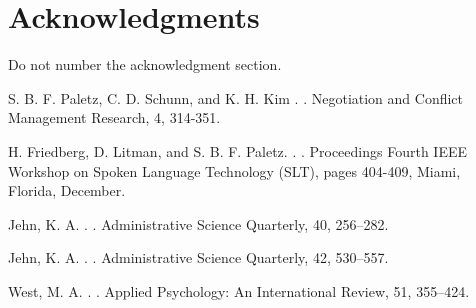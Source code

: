 \documentclass[11pt,letterpaper]{article}
\begin{document}
\section*{Acknowledgments}

Do not number the acknowledgment section.

\begin{thebibliography}{}

S. B. F. Paletz, C. D. Schunn, and K. H. Kim
. 
. 
\newblock Negotiation and Conflict Management Research, 4, 314-351.

H. Friedberg, D. Litman, and S. B. F. Paletz.
. 
. 
\newblock Proceedings Fourth IEEE Workshop on Spoken Language Technology (SLT), pages 404-409, Miami, Florida, December.

Jehn, K. A.
. 
. 
\newblock Administrative Science Quarterly, 40, 256–282.

Jehn, K. A.
. 
. 
\newblock Administrative Science Quarterly, 42, 530–557.

West, M. A.
. 
. 
\newblock Applied Psychology: An International Review, 51, 355–424.

\end{thebibliography}
\end{document}
